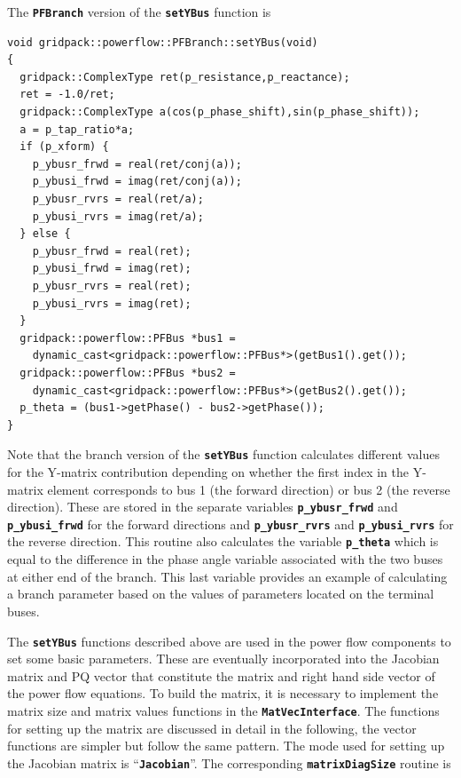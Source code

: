 \documentclass[12pt]{report} %
\begin{document}
The \texttt{\textbf{PFBranch}} version of the \texttt{\textbf{setYBus}} function is

{
\color{red}
\begin{Verbatim}[fontseries=b]
void gridpack::powerflow::PFBranch::setYBus(void)
{
  gridpack::ComplexType ret(p_resistance,p_reactance);
  ret = -1.0/ret;
  gridpack::ComplexType a(cos(p_phase_shift),sin(p_phase_shift));
  a = p_tap_ratio*a;
  if (p_xform) {
    p_ybusr_frwd = real(ret/conj(a));
    p_ybusi_frwd = imag(ret/conj(a));
    p_ybusr_rvrs = real(ret/a);
    p_ybusi_rvrs = imag(ret/a);
  } else {
    p_ybusr_frwd = real(ret);
    p_ybusi_frwd = imag(ret);
    p_ybusr_rvrs = real(ret);
    p_ybusi_rvrs = imag(ret);
  }
  gridpack::powerflow::PFBus *bus1 =
    dynamic_cast<gridpack::powerflow::PFBus*>(getBus1().get());
  gridpack::powerflow::PFBus *bus2 =
    dynamic_cast<gridpack::powerflow::PFBus*>(getBus2().get());
  p_theta = (bus1->getPhase() - bus2->getPhase());
}
\end{Verbatim}
}

Note that the branch version of the \texttt{\textbf{setYBus}} function calculates different values for the Y-matrix contribution depending on whether the first index in the Y-matrix element corresponds to bus 1 (the forward direction) or bus 2 (the reverse direction). These are stored in the separate variables \texttt{\textbf{p\_ybusr\_frwd}} and \texttt{\textbf{p\_ybusi\_frwd}} for the forward directions and \texttt{\textbf{p\_ybusr\_rvrs}} and \texttt{\textbf{p\_ybusi\_rvrs}} for the reverse direction. This routine also calculates the variable \texttt{\textbf{p\_theta}} which is equal to the difference in the phase angle variable associated with the two buses at either end of the branch. This last variable provides an example of calculating a branch parameter based on the values of parameters located on the terminal buses.

The \texttt{\textbf{setYBus}} functions described above are used in the power flow components to set some basic parameters. These are eventually incorporated into the Jacobian matrix and PQ vector that constitute the matrix and right hand side vector of the power flow equations. To build the matrix, it is necessary to implement the matrix size and matrix values functions in the \texttt{\textbf{MatVecInterface}}. The functions for setting up the matrix are discussed in detail in the following, the vector functions are simpler but follow the same pattern. The mode used for setting up the Jacobian matrix is ``\texttt{\textbf{Jacobian}}''. The corresponding \texttt{\textbf{matrixDiagSize}} routine is
\end{document}
